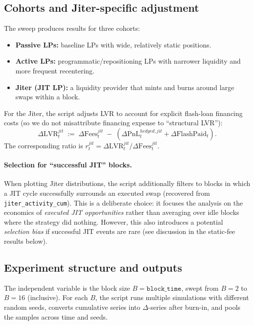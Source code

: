 \documentclass[11pt]{article}
\begin{document}
\subsection{Cohorts and Jiter-specific adjustment}

The sweep produces results for three cohorts:
\begin{itemize}
  \item \textbf{Passive LPs:} baseline LPs with wide, relatively static positions.
  \item \textbf{Active LPs:} programmatic/repositioning LPs with narrower liquidity and more frequent recentering.
  \item \textbf{Jiter (JIT LP):} a liquidity provider that mints and burns around large swaps within a block.
\end{itemize}

For the Jiter, the script adjusts LVR to account for explicit flash-loan financing costs (so we do not misattribute financing
expense to ``structural LVR''):
\begin{equation}
  \Delta\mathrm{LVR}^{jit}_t
  \;:=\;
  \Delta\mathrm{Fees}^{jit}_t
  \;-\;
  \left(\Delta\mathrm{PnL}^{hedged,jit}_t + \Delta\mathrm{FlashPaid}_t\right).
  \label{eq:jiter_lvr_def}
\end{equation}
The corresponding ratio is $r^{jit}_t=\Delta\mathrm{LVR}^{jit}_t/\Delta\mathrm{Fees}^{jit}_t$.

\paragraph{Selection for ``successful JIT'' blocks.}
When plotting Jiter distributions, the script additionally filters to blocks in which a JIT cycle successfully surrounds an
executed swap (recovered from \texttt{jiter\_activity\_cum}). This is a deliberate choice: it focuses the analysis on the
economics of \emph{executed JIT opportunities} rather than averaging over idle blocks where the strategy did nothing.
However, this also introduces a potential \emph{selection bias} if successful JIT events are rare (see discussion in the
static-fee results below).

\subsection{Experiment structure and outputs}

The independent variable is the block size $B=\texttt{block\_time}$, swept from $B=2$ to $B=16$ (inclusive). For each $B$,
the script runs multiple simulations with different random seeds, converts cumulative series into $\Delta$-series after burn-in,
and pools the samples across time and seeds.
\end{document}
